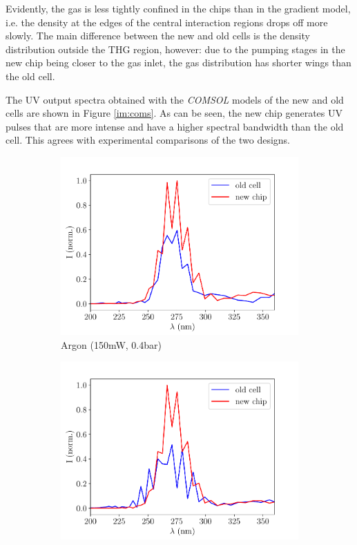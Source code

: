 \documentclass[a4paper]{jpconf}
\begin{document}
Evidently, the gas is less tightly confined in the chips than in the gradient model, i.e. the density at the edges of the central interaction regions drops off more slowly. The main difference between the new and old cells is the density distribution outside the THG region, however: due to the pumping stages in the new chip being closer to the gas inlet, the gas distribution has shorter wings than the old cell. \par 
The UV output spectra obtained with the \textit{COMSOL} models of the new and old cells are shown in Figure \ref{im:coms}. As can be seen, the new chip generates UV pulses that are more intense and have a higher spectral bandwidth than the old cell. This agrees with experimental comparisons of the two designs. \par 
\begin{figure}[h]
\centering
 \begin{subfigure}{0.5\textwidth}
\includegraphics[width=\textwidth]{im/Ar_old_v_new}
\caption{Argon (150mW, 0.4bar)}\label{im:coms_Ar}
\end{subfigure}
 \begin{subfigure}{0.5\textwidth}
\includegraphics[width=\textwidth]{im/Ne_old_v_new}

\end{subfigure}
\end{figure}
\end{document}
